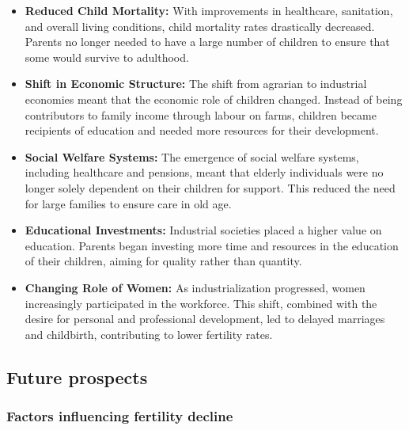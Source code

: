 \documentclass[../summary.tex]{subfiles}
\begin{document}
\begin{itemize}
	\item \textbf{Reduced Child Mortality:} With improvements in healthcare, sanitation, and overall living conditions, child mortality rates drastically decreased. Parents no longer needed to have a large number of children to ensure that some would survive to adulthood.
	\item \textbf{Shift in Economic Structure:} The shift from agrarian to industrial economies meant that the economic role of children changed. Instead of being contributors to family income through labour on farms, children became recipients of education and needed more resources for their development.
	\item \textbf{Social Welfare Systems:} The emergence of social welfare systems, including healthcare and pensions, meant that elderly individuals were no longer solely dependent on their children for support. This reduced the need for large families to ensure care in old age.
	\item \textbf{Educational Investments:} Industrial societies placed a higher value on education. Parents began investing more time and resources in the education of their children, aiming for quality rather than quantity.
	\item \textbf{Changing Role of Women:} As industrialization progressed, women increasingly participated in the workforce. This shift, combined with the desire for personal and professional development, led to delayed marriages and childbirth, contributing to lower fertility rates.
\end{itemize}
\newpage

\subsection{Future prospects}
\subsubsection{Factors influencing fertility decline}
\end{document}

